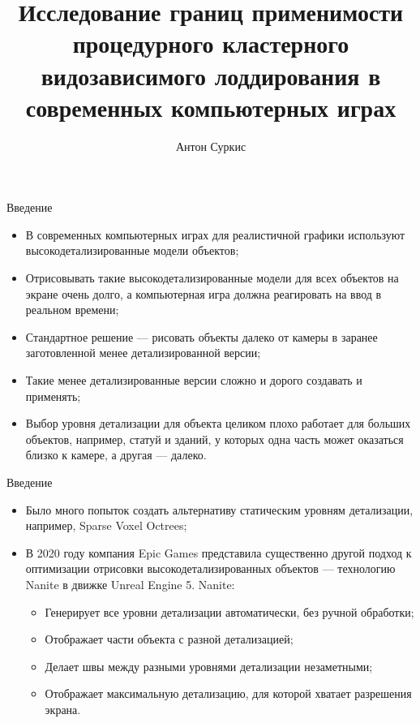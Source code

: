 \documentclass{beamer}
\title{Исследование границ применимости процедурного кластерного видозависимого лоддирования в современных компьютерных играх}
\author{Антон Суркис}
\begin{document}
    \maketitle

    \begin{frame}{Введение}
        \begin{itemize}
            \item
            В современных компьютерных играх для реалистичной графики
            используют высокодетализированные модели объектов;

            \item
            Отрисовывать такие высокодетализированные модели для
            всех объектов на экране очень долго,
            а компьютерная игра должна реагировать на ввод
            в реальном времени;

            \item
            Стандартное решение --- рисовать объекты
            далеко от камеры в заранее заготовленной
            менее детализированной версии;

            \item
            Такие менее детализированные версии
            сложно и дорого создавать и применять;

            \item
            Выбор уровня детализации для объекта целиком
            плохо работает для больших объектов,
            например, статуй и зданий,
            у которых одна часть может оказаться близко
            к камере, а другая --- далеко.
        \end{itemize}
    \end{frame}

    \begin{frame}{Введение}
        \begin{itemize}
            \item Было много попыток создать альтернативу
            статическим уровням детализации, например,
            Sparse Voxel Octrees;

            \item В 2020 году компания Epic Games представила
            существенно другой подход к оптимизации
            отрисовки высокодетализированных объектов
            --- технологию Nanite в движке Unreal Engine 5.
            Nanite:
            \begin{itemize}
                \item Генерирует все уровни детализации автоматически,
                без ручной обработки;
                \item Отображает части объекта с разной детализацией;
                \item Делает швы между разными уровнями детализации незаметными;
                \item Отображает максимальную детализацию,
                для которой хватает разрешения экрана.
            \end{itemize}
        \end{itemize}
    \end{frame}
\end{document}
